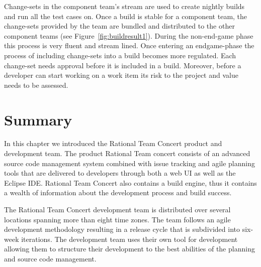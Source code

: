 Change-sets in the component team's stream are used to create nightly builds and run all the test cases on.
Once a build is stable for a component team, the change-sets provided by the team are bundled and distributed to the other component teams (see Figure~\ref{fig:buildresult1}).
During the non-end-game phase this process is very fluent and stream lined.
Once entering an endgame-phase the process of including change-sets into a build becomes more regulated.
Each change-set needs approval before it is included in a build.
Moreover, before a developer can start working on a work item its risk to the project and value needs to be assessed.

\section{Summary}
In this chapter we introduced the Rational Team Concert product and development team.
The product Rational Team concert consists of an advanced source code management system combined with issue tracking and agile planning tools that are delivered to developers through both a web UI as well as the Eclipse IDE.
Rational Team Concert also contains a build engine, thus it contains a wealth of information about the development process and build success.

The Rational Team Concert development team is distributed over several locations spanning more than eight time zones.
The team follows an agile development methodology resulting in a release cycle that is subdivided into six-week iterations.
The development team uses their own tool for development allowing them to structure their development to the best abilities of the planning and source code management.